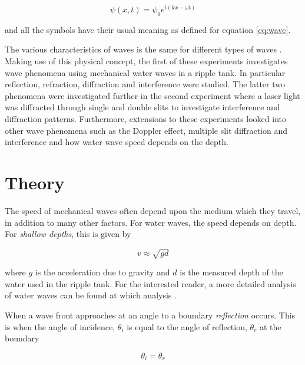 \documentclass{article}
\begin{document}
\begin{equation}
\label{eq:complex-wave}
\psi(x, t) = \psi_0 e^{i(kx - \omega t)}
\end{equation}

\vspace{2mm}
\noindent
and all the symbols have their usual meaning as defined for equation \eqref{eq:wave}.

\vspace{2mm}
\noindent
The various characteristics of waves is the same for different types of waves \cite{Paper01}. Making use of this physical concept, the first of these experiments investigates wave phenomena using mechanical water waves in a ripple tank. In particular reflection, refraction, diffraction and interference were studied. The latter two phenomena were investigated further in the second experiment where a laser light was diffracted through single and double slits to investigate interference and diffraction patterns. Furthermore, extensions to these experiments looked into other wave phenomena such as the Doppler effect, multiple slit diffraction and interference and how water wave speed depends on the depth.


\section{Theory}
\label{sec:theory}

The speed of mechanical waves often depend upon the medium which they travel, in addition to many other factors. For water waves, the speed depends on depth. For \textit{shallow depths}, this is given by \cite{Web01}

\begin{equation}
\label{eq:water-waves}
v \approx \sqrt{gd}
\end{equation}

\vspace{2mm}
\noindent
where $g$ is the acceleration due to gravity and $d$ is the measured depth of the water used in the ripple tank. For the interested reader, a more detailed analysis of water waves can be found at which analysis \cite{Web01}. 

\vspace{2mm}
\noindent
When a wave front approaches at an angle to a boundary \textit{reflection} occurs. This is when the angle of incidence, $\theta_i$ is equal to the angle of reflection, $\theta_r$ at the boundary

\begin{equation}
\label{eq:reflection}
\theta_i = \theta_r
\end{equation}
\end{document}
